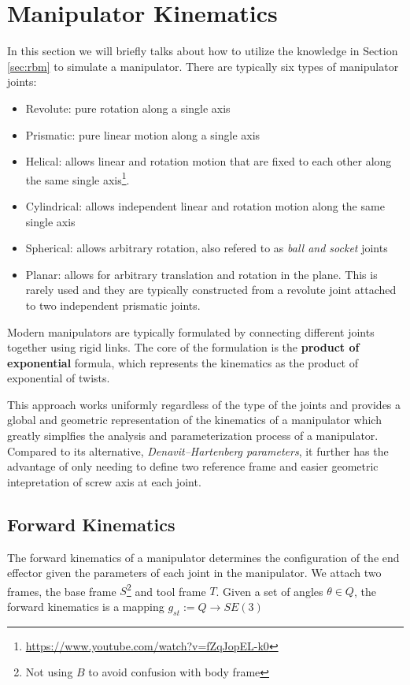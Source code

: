 \documentclass[letterpaper]{article}
\begin{document}
\section{Manipulator Kinematics}
In this section we will briefly talks about how to utilize the knowledge in
Section \ref{sec:rbm} to simulate a manipulator. There are typically six types of
manipulator joints:
\begin{itemize}
  \setlength\itemsep{0pt}
  \item Revolute: pure rotation along a single axis
  \item Prismatic: pure linear motion along a single axis
  \item Helical: allows linear and rotation motion that are fixed to each other along the same single axis\footnote{\url{https://www.youtube.com/watch?v=fZqJopEL-k0}}. 
  \item Cylindrical: allows independent linear and rotation motion along the same single axis
  \item Spherical: allows arbitrary rotation, also refered to as \emph{ball and socket} joints
  \item Planar: allows for arbitrary translation and rotation in the plane. This is rarely used and they are typically constructed
    from a revolute joint attached to two independent prismatic joints. 
\end{itemize}
Modern manipulators are typically formulated by connecting different joints together
using rigid links. The core of the formulation is the \textbf{product of exponential}
formula, which represents the kinematics as the product of exponential of twists. 

This approach works uniformly regardless of the type of the joints and provides a global and
geometric representation of the kinematics of a manipulator which greatly simplfies
the analysis and parameterization process of a manipulator. Compared to its alternative,
\emph{Denavit–Hartenberg parameters}, it further has the advantage of only needing to
define two reference frame and easier geometric intepretation of screw axis at each joint. 

\subsection{Forward Kinematics}
The forward kinematics of a manipulator determines the configuration of the end effector
given the parameters of each joint in the manipulator. We attach
two frames, the base frame $S$\footnote{Not using $B$ to avoid confusion with body frame} and
tool frame $T$. Given a set of angles $\theta \in Q$, the forward kinematics
is a mapping $g_{st}:= Q \rightarrow SE(3)$
\end{document}
